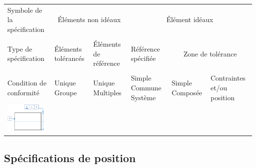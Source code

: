 \documentclass[11pt,oneside]{article}
\begin{document}
\begin{exemple}
\footnotesize{
\begin{center}
\begin{tabular}{|p{}|p{}|p{}|p{}|p{}|p{}|}
\hline
Symbole de la spécification & 
\multicolumn{2}{c|}{Éléments non idéaux} &
\multicolumn{3}{c|}{Élément idéaux} \\
&
\multicolumn{2}{c|}{} &
\multicolumn{3}{c|}{}\\
\hline
Type de spécification & 
Éléments tolérancés &
Éléments de référence & 
Référence spécifiée & 
\multicolumn{2}{c|}{Zone de tolérance} \\
&&&&
\multicolumn{2}{c|}{}\\
\hline
Condition de conformité & 
Unique Groupe & Unique Multiples &
Simple Commune Système &
Simple Composée & 
Contraintes et/ou position \\
\hline
\multirow{12}{*}{\includegraphics[width=2cm]{png/ex_perpendicularite}}&&&&&\\
&&&&&\\
&&&&&\\
&&&&&\\
&&&&&\\
&&&&&\\
&&&&&\\
&&&&&\\
&&&&&\\
&&&&&\\
&&&&&\\
&&&&&\\
\hline
\end{tabular}
\end{center}
}
\end{exemple}






\subsection{Spécifications de position}
\end{document}
